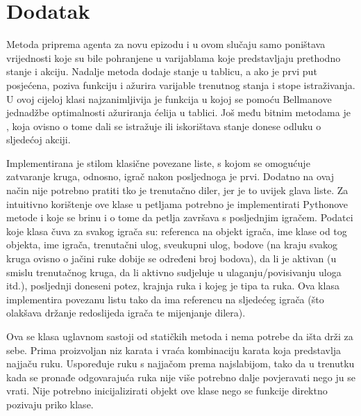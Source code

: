 \section{Dodatak}

Metoda  priprema agenta za novu epizodu i u ovom slučaju samo poništava vrijednosti koje su bile pohranjene u varijablama koje predstavljaju prethodno stanje i akciju. Nadalje metoda  dodaje stanje u tablicu, a ako je prvi put posjećena, poziva funkciju  i ažurira varijable trenutnog stanja i stope istraživanja. U ovoj cijeloj klasi najzanimljivija je funkcija  u kojoj se pomoću Bellmanove jednadžbe optimalnosti ažuriranja ćelija u tablici. Još među bitnim metodama je , koja ovisno o tome dali se istražuje ili iskorištava stanje donese odluku o sljedećoj akciji.
\newpage

Implementirana je stilom klasične povezane liste, s kojom se omogućuje zatvaranje kruga, odnosno, igrač nakon posljednoga je prvi. Dodatno na ovaj način nije potrebno pratiti tko je trenutačno diler, jer je to uvijek glava liste. Za intuitivno korištenje ove klase u petljama potrebno je implementirati Pythonove metode  i  koje se brinu i o tome da petlja završava s posljednjim igračem. Podatci koje klasa čuva za svakog igrača su: referenca na objekt igrača, ime klase od tog objekta, ime igrača, trenutačni ulog, sveukupni ulog, bodove (na kraju svakog kruga ovisno o jačini ruke dobije se određeni broj bodova), da li je aktivan (u smislu trenutačnog kruga, da li aktivno sudjeluje u ulaganju/povisivanju uloga itd.), posljednji doneseni potez, krajnja ruka i kojeg je tipa ta ruka. Ova klasa implementira povezanu listu tako da ima referencu na sljedećeg igrača (što olakšava držanje redoslijeda igrača te mijenjanje dilera).
\newpage

Ova se klasa uglavnom sastoji od statičkih metoda i nema potrebe da išta drži za sebe. Prima proizvoljan niz karata i vraća kombinaciju karata koja predstavlja najjaču ruku. Uspoređuje ruku s najjačom prema najslabijom, tako da u trenutku kada se pronađe odgovarajuća ruka nije više potrebno dalje povjeravati nego ju se vrati. Nije potrebno inicijalizirati objekt ove klase nego se funkcije direktno pozivaju priko klase.

\newpage

